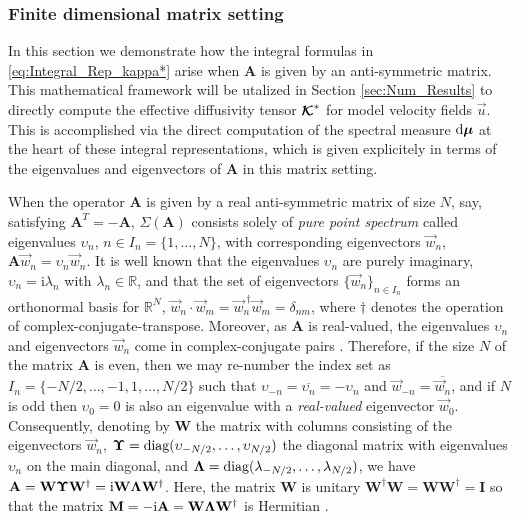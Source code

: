 \documentclass[11pt]{amsart}
\newcommand{\I}{\mathrm{i}}
\renewcommand{\d}{\mathrm{d}}
\newcommand{\Mb}{\mathbf{M}}
\newcommand{\Ib}{\mathbf{I}}
\newcommand{\Ab}{\mathbf{A}}
\newcommand{\Wb}{\mathbf{W}}
\newcommand\Kbc{\mbox{\boldmath${\mathcal{K}}$}}
\newcommand\bmu{\mbox{\boldmath${\mu}$}}
\newcommand\bUpsilon{\mbox{\boldmath${\Upsilon}$}}
\newcommand\bLambda{\mbox{\boldmath${\Lambda}$}}
\begin{document}
\subsubsection{Finite dimensional matrix
  setting}\label{sec:Integral_Rep_Matrix} 
%
In this section we demonstrate how the integral formulas in
\eqref{eq:Integral_Rep_kappa*} arise when $\Ab$ is given by an
anti-symmetric matrix. This mathematical framework will be utalized in
Section \ref{sec:Num_Results} to directly compute the effective
diffusivity tensor $\Kbc^*$ for model velocity fields $\vec{u}$. This
is accomplished via the direct computation of the spectral measure
$\d\bmu$ at the heart of these integral representations, which is
given explicitely in terms of the eigenvalues and eigenvectors of
$\Ab$ in this matrix setting.  





When the operator $\Ab$ is given by a real anti-symmetric matrix of size
$N$, say, satisfying $\Ab^T=-\Ab$, $\Sigma(\Ab)$ consists solely of
\emph{pure point spectrum} called eigenvalues $\upsilon_n$, $n\in I_n=\{1,\ldots,N\}$,
with corresponding eigenvectors $\vec{w}_n$,
$\Ab\vec{w}_n=\upsilon_n\vec{w}_n$. It is well known \cite{Horn_Johnson-1990}
that the eigenvalues $\upsilon_n$ are purely imaginary, $\upsilon_n=\I\lambda_n$ with
$\lambda_n\in\mathbb{R}$, and that the set of eigenvectors
$\{\vec{w}_n\}_{n\in I_n}$ forms an orthonormal basis \cite{Keener-2000}
for $\mathbb{R}^N$,
$\vec{w}_n\cdot\vec{w}_m=\vec{w}_n^{\;\dagger}\vec{w}_m=\delta_{nm}$, where $\dagger$
denotes the operation of complex-conjugate-transpose. Moreover, as 
$\Ab$ is real-valued, the eigenvalues $\upsilon_n$ and eigenvectors
$\vec{w}_n$ come in complex-conjugate pairs
\cite{Horn_Johnson-1990}. Therefore, if the size $N$ of the matrix
$\Ab$ is even, then we may re-number the index set as
$I_n=\{-N/2,\ldots,-1,1,\ldots ,N/2\}$ such that $\upsilon_{-n}=\overline{\upsilon_n}=-\upsilon_n$ and
$\vec{w}_{-n}=\overline{\vec{w}_n}$, and if $N$ is odd then $\upsilon_0=0$ is
also an eigenvalue with a \emph{real-valued} eigenvector
$\vec{w}_0$. Consequently, denoting by $\Wb$ the matrix with columns
consisting of the eigenvectors $\vec{w}_n$,
$\bUpsilon=\text{diag}(\upsilon_{-N/2},\ldots,\upsilon_{N/2})$ the diagonal matrix with
eigenvalues $\upsilon_n$ on the main diagonal, and
$\bLambda=\text{diag}(\lambda_{-N/2},\ldots,\lambda_{N/2})$, we have
$\Ab=\Wb\bUpsilon\Wb^\dagger=\I\Wb\bLambda\Wb^\dagger$. Here, the matrix $\Wb$ is
unitary $\Wb^\dagger\Wb=\Wb\Wb^\dagger=\Ib$ so that the matrix
$\Mb=-\I\Ab=\Wb\bLambda\Wb^\dagger$ is Hermitian
\cite{Horn_Johnson-1990,Keener-2000}.  
\end{document}
